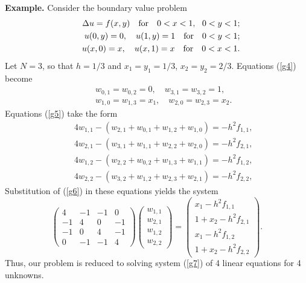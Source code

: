 \vskip 0.3cm
 
{\bf Example.} Consider the boundary value problem
\begin{eqnarray}
&&\Delta u = f(x,y) \quad {\rm for} \quad 0< x< 1, \ \ 0< y< 1;  \nonumber \\
&&u(0,y)=0, \quad u(1,y)=1 \quad {\rm for} \quad 0< y< 1;  \nonumber \\
&&u(x,0)=x, \quad u(x,1)=x \quad {\rm for} \quad 0< x< 1.  \nonumber
\end{eqnarray}
Let $N=3$, so that $h=1/3$ and $x_{1}=y_{1}=1/3$, $x_{2}=y_{2}=2/3$.
Equations (\ref{g4}) become
\begin{eqnarray}
&&w_{0,1}=w_{0,2}=0, \quad w_{3,1}=w_{3,2}=1, \nonumber \\
&&w_{1,0}=w_{1,3}=x_{1}, \quad w_{2,0}=w_{2,3}=x_{2}. \label{g6}
\end{eqnarray}
Equations (\ref{g5}) take the form
\begin{eqnarray}
&&4w_{1,1}-\left(w_{2,1}+w_{0,1}+w_{1,2}+w_{1,0}\right)=-h^2f_{1,1}, \nonumber \\
&&4w_{2,1}-\left(w_{3,1}+w_{1,1}+w_{2,2}+w_{2,0}\right)=-h^2f_{2,1}, \nonumber \\
&&4w_{1,2}-\left(w_{2,2}+w_{0,2}+w_{1,3}+w_{1,1}\right)=-h^2f_{1,2}, \nonumber \\
&&4w_{2,2}-\left(w_{3,2}+w_{1,2}+w_{2,3}+w_{2,1}\right)=-h^2f_{2,2}, \nonumber
\end{eqnarray}
Substitution of (\ref{g6}) in these equations yields the system
\begin{equation}
\left(
\begin{array}{cccc}
4 &-1 &-1 &0 \\
-1 &4 &0 &-1 \\
-1 &0 &4 &-1 \\
0 &-1 &-1 &4
\end{array}\right)
\left(
\begin{array}{c}
w_{1,1} \\
w_{2,1} \\
w_{1,2} \\
w_{2,2}
\end{array}\right)=
\left(
\begin{array}{c}
x_{1}-h^2f_{1,1} \\
1+x_{2}-h^2f_{2,1} \\
x_{1}-h^2f_{1,2} \\
1+x_{2}-h^2f_{2,2}
\end{array}\right). \label{g7}
\end{equation}
Thus, our problem is reduced to solving system (\ref{g7})
of 4 linear equations for 4 unknowns.



